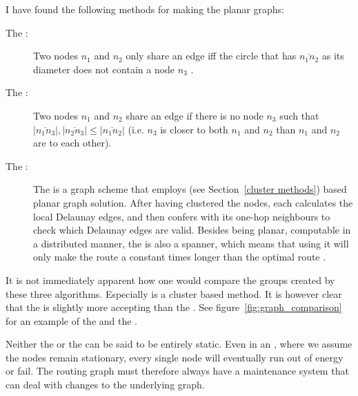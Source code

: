 \documentclass[letter, 12pt, english, draft]{article}
\begin{document}
I have found the following methods for making the planar graphs:
\begin{description}
\item[The \gabe:] Two nodes $n_1$ and $n_2$ only share an edge iff the circle that has $\overline{n_1n_2}$ as its diameter does not contain a node $n_3$ \cite{gopher}. 
\item[The \rng:] Two nodes $n_1$ and $n_2$ share an edge if there is no node $n_3$ such that $|\overline{n_1n_3}|, |\overline{n_2n_3}| \leq |\overline{n_1n_2}|$ (i.e. $n_3$ is closer to both $n_1$ and $n_2$ than $n_1$ and $n_2$ are to each other).
\item[The \rdg:] The \rdg is a graph scheme that employs \ch (see Section~\ref{cluster methods}) based planar graph solution. After having clustered the nodes, each \ch calculates the local Delaunay edges, and then confers with its one-hop neighbours to check which Delaunay edges are valid. Besides being planar, computable in a distributed manner, the \rdg is also a spanner, which means that using it will only make the route a constant times longer than the optimal route \cite{GeoSpanners}.
\end{description}


It is not immediately apparent how one would compare the groups created by these three algorithms. Especially \rdg is a cluster based method. It is however clear that the \rng is slightly more accepting than the \gabe. See figure~\ref{fig:graph_comparison} for an example of the \rng and the \gabe.



Neither the \manet or the \anet can be said to be entirely static. Even in an \anet, where we assume the nodes remain stationary, every single node will eventually run out of energy or fail. The routing graph must therefore always have a maintenance system that can deal with changes to the underlying graph. 
\end{document}
